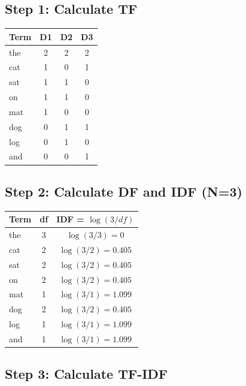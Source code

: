 \subsection{Step 1: Calculate TF}

\begin{center}
\begin{tabular}{l|ccc}
\toprule
Term & D1 & D2 & D3 \\
\midrule
the & 2 & 2 & 2 \\
cat & 1 & 0 & 1 \\
sat & 1 & 1 & 0 \\
on & 1 & 1 & 0 \\
mat & 1 & 0 & 0 \\
dog & 0 & 1 & 1 \\
log & 0 & 1 & 0 \\
and & 0 & 0 & 1 \\
\bottomrule
\end{tabular}
\end{center}

\subsection{Step 2: Calculate DF and IDF (N=3)}

\begin{center}
\begin{tabular}{l|cc}
\toprule
Term & df & IDF = $\log(3/df)$ \\
\midrule
the & 3 & $\log(3/3) = 0$ \\
cat & 2 & $\log(3/2) = 0.405$ \\
sat & 2 & $\log(3/2) = 0.405$ \\
on & 2 & $\log(3/2) = 0.405$ \\
mat & 1 & $\log(3/1) = 1.099$ \\
dog & 2 & $\log(3/2) = 0.405$ \\
log & 1 & $\log(3/1) = 1.099$ \\
and & 1 & $\log(3/1) = 1.099$ \\
\bottomrule
\end{tabular}
\end{center}

\subsection{Step 3: Calculate TF-IDF}

